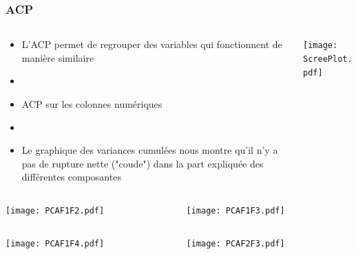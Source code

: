 \subsubsection{ACP}
\begin{frame}{\insertsubsubsection}
  \begin{columns}
    \begin{column}{.5\textwidth}
      \begin{itemize}
        \item L'ACP permet de regrouper des variables qui fonctionnent de manière similaire
        \item[]
        \item ACP sur les colonnes numériques
        \item[]
        \item Le graphique des variances cumulées nous montre qu'il n'y a pas de rupture nette ("coude")
              dans la part expliquée des différentes composantes
      \end{itemize}
    \end{column}
    \begin{column}{.5\textwidth}
      \texttt{[image: ScreePlot.pdf]}
    \end{column}
  \end{columns}
\end{frame}

\begin{frame}
  \begin{columns}
    \begin{column}{.5\textwidth}
      \texttt{[image: PCAF1F2.pdf]}
    \end{column}
    \begin{column}{.5\textwidth}
      \texttt{[image: PCAF1F3.pdf]}
    \end{column}
  \end{columns}
\end{frame}

\begin{frame}
  \begin{columns}
    \begin{column}{.5\textwidth}
      \texttt{[image: PCAF1F4.pdf]}
    \end{column}
    \begin{column}{.5\textwidth}
      \texttt{[image: PCAF2F3.pdf]}
    \end{column}
  \end{columns}
\end{frame}

